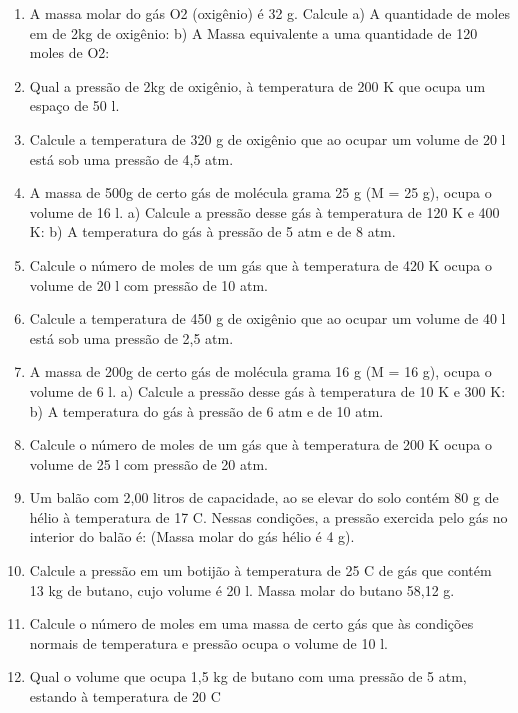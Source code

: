 \documentclass[12pt,a4paper]{book}
\begin{document}
\begin{enumerate}
\item A massa molar do gás O2 (oxigênio) é 32 g. Calcule 
\newline a)	A quantidade de moles em de 2kg de oxigênio:
\newline b)	A Massa equivalente a uma quantidade de 120 moles de O2: 
\item  Qual a pressão de 2kg de oxigênio, à temperatura de 200 K que ocupa um espaço de 50 l. 
\item  Calcule a temperatura de 320 g de oxigênio que ao ocupar um volume de 20 l está sob uma pressão de 4,5 atm.
\item  A massa de 500g de certo gás de molécula grama 25 g (M = 25 g), ocupa o volume de 16 l. 
\newline a)	Calcule a pressão desse gás à temperatura de 120 K e 400 K:
\newline b)	A temperatura do gás à pressão de 5 atm e de 8 atm. 
\item  Calcule o número de moles de um gás que à temperatura de 420 K ocupa o volume de 20 l com pressão de 10 atm.
\item  Calcule a temperatura de 450 g de oxigênio que ao ocupar um volume de 40 l está sob uma pressão de 2,5 atm.
\item  A massa de 200g de certo gás de molécula grama 16 g (M = 16 g), ocupa o volume de 6 l. 
\newline a)	Calcule a pressão desse gás à temperatura de 10 K e 300 K:
\newline b)	A temperatura do gás à pressão de 6 atm e de 10 atm. 
\item  Calcule o número de moles de um gás que à temperatura de 200 K ocupa o volume de 25 l com pressão de 20 atm.
\item  Um balão com 2,00 litros de capacidade, ao se elevar do solo contém 80 g de hélio à temperatura de 17 C. Nessas condições, a pressão exercida pelo gás no interior do balão é: (Massa molar do gás hélio é 4 g).
\item  Calcule a pressão em um botijão à temperatura de 25 C de gás que contém 13 kg de butano, cujo volume é 20 l. Massa molar do butano 58,12 g.
\item  Calcule o número de moles em uma massa de certo gás que às condições normais de temperatura e pressão ocupa o volume de 10 l.
\item  Qual o volume que ocupa 1,5 kg de butano com uma pressão de 5 atm, estando à temperatura de 20 C
\end{enumerate}
\end{document}
